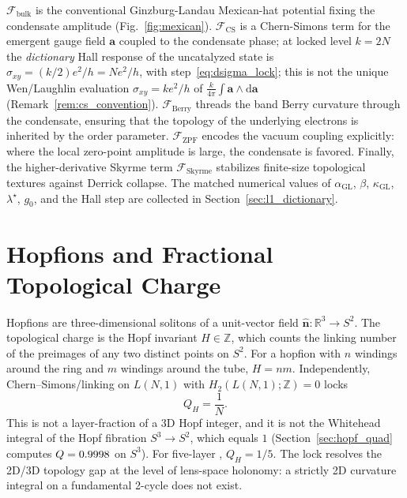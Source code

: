 \documentclass[11pt,letterpaper]{article}
\begin{document}
$\mathcal{F}_{\text{bulk}}$ is the conventional Ginzburg-Landau Mexican-hat potential fixing the condensate amplitude (Fig.~\ref{fig:mexican}). $\mathcal{F}_{\text{CS}}$ is a Chern-Simons term for the emergent gauge field $\mathbf{a}$ coupled to the condensate phase; at locked level $k=2N$ the \emph{dictionary} Hall response of the uncatalyzed state is $\sigma_{xy}=(k/2)e^2/h=N e^2/h$, with step~\eqref{eq:dsigma_lock}; this is not the unique Wen/Laughlin evaluation $\sigma_{xy}=k e^2/h$ of $\frac{k}{4\pi}\int\mathbf{a}\wedge\mathrm{d}\mathbf{a}$ (Remark~\ref{rem:cs_convention})\cite{Laughlin1983,Wen1995}. $\mathcal{F}_{\text{Berry}}$ threads the band Berry curvature through the condensate, ensuring that the topology of the underlying electrons is inherited by the \TEVC{} order parameter\cite{Xiao2010,Qi2011}. $\mathcal{F}_{\text{ZPF}}$ encodes the vacuum coupling explicitly: where the local zero-point amplitude is large, the condensate is favored. Finally, the higher-derivative Skyrme term $\mathcal{F}_{\text{Skyrme}}$ stabilizes finite-size topological textures against Derrick collapse\cite{Faddeev1997,Sutcliffe2007}. The matched numerical values of $\alpha_{\mathrm{GL}}$, $\beta$, $\kappa_{\mathrm{GL}}$, $\lambda^\star$, $g_0$, and the Hall step are collected in Section~\ref{sec:l1_dictionary}.




\section{Hopfions and Fractional Topological Charge}
\label{sec:hopfions}

Hopfions are three-dimensional solitons of a unit-vector field $\hat{\mathbf{n}}: \mathbb{R}^3 \to S^2$. The topological charge is the Hopf invariant $H \in \mathbb{Z}$, which counts the linking number of the preimages of any two distinct points on $S^2$\cite{Faddeev1997,Sutcliffe2007,Ackerman2017,Kent2021}. For a hopfion with $n$ windings around the ring and $m$ windings around the tube, $H = nm$. Independently, Chern--Simons/linking on $L(N,1)$ with $H_2(L(N,1);\mathbb{Z})=0$ locks
\begin{equation}
Q_H = \frac{1}{N}.
\end{equation}
This is not a layer-fraction of a 3D Hopf integer, and it is not the Whitehead integral of the Hopf fibration $S^3\to S^2$, which equals $1$ (Section~\ref{sec:hopf_quad} computes $Q=0.9998$ on $S^3$). For five-layer \MATBG{}, $Q_H = 1/5$. The lock resolves the 2D/3D topology gap at the level of lens-space holonomy: a strictly 2D curvature integral on a fundamental 2-cycle does not exist.
\end{document}
